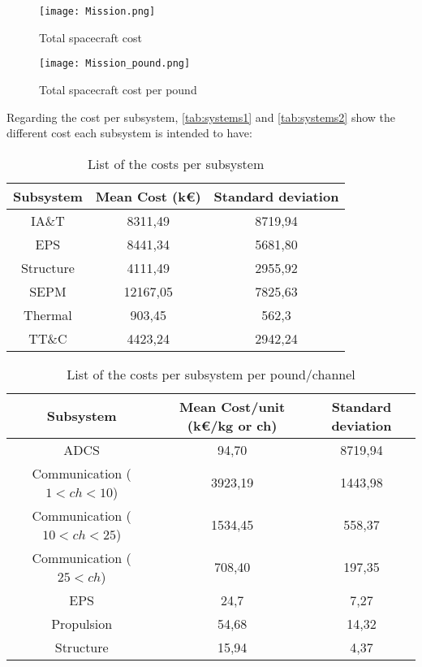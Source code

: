 	\begin{figure}
		\centering
		\begin{minipage}{1\textwidth}
		\centering
		\texttt{[image: Mission.png]}
		\caption{Total spacecraft cost}
		\label{fig:mission}
		\end{minipage}
		\hspace{20mm}
		\begin{minipage}{.95\textwidth}
		\centering
		\texttt{[image: Mission\_pound.png]}
		\caption{Total spacecraft cost per pound}
		\label{fig:mission_pound}
		\end{minipage}
	\end{figure}

	Regarding the cost per subsystem, \autoref{tab:systems1} and \autoref{tab:systems2} show the different cost each 				subsystem is intended to have:

	\begin{table}
		\centering
		\begin{tabular}{ccc}
		\toprule
		Subsystem & Mean Cost (k\euro) & Standard deviation\\
		\midrule
		IA\&T     & 8311,49   & 8719,94\\
		EPS        & 8441,34   & 5681,80\\
		Structure & 4111,49   & 2955,92\\
		SEPM      & 12167,05 & 7825,63\\
		Thermal  & 903,45    & 562,3\\
		TT\&C    & 4423,24   & 2942,24\\
		\bottomrule
		\end{tabular}
		\caption{List of the costs per subsystem}
		\label{tab:systems1}
	\end{table}

	\begin{table}
		\centering
		\begin{tabular}{ccc}
		\toprule
		Subsystem & Mean Cost/unit (k\euro/kg or ch) & Standard deviation\\
		\midrule
		ADCS                                         & 94,70     & 8719,94\\
		Communication ($1 < ch < 10$)   & 3923,19 & 1443,98\\
		Communication ($10 < ch < 25$) & 1534,45 & 558,37\\
		Communication ($25 < ch$)         & 708,40   & 197,35\\
		EPS                                            & 24,7      & 7,27\\
		Propulsion                                  & 54,68     & 14,32\\
		Structure                                    & 15,94     & 4,37\\
		\bottomrule
		\end{tabular}
		\caption{List of the costs per subsystem per pound/channel}
		\label{tab:systems2}
	\end{table}

